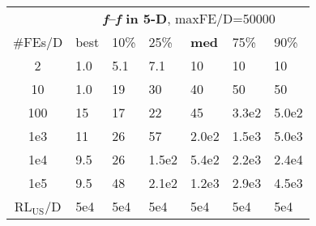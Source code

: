 \begin{tabular}{c|llllll}
 & \multicolumn{6}{|c}{\textbf{\textit{f}\raisebox{-0.35ex}{1}--\textit{f}\raisebox{-0.35ex}{24} in 5-D}, maxFE/D=50000}\\
\#FEs/D & best & 10\% & 25\% & \textbf{med} & 75\% & 90\%\\
2 & \hspace*{1ex}1.0 & \hspace*{1ex}5.1 & \hspace*{1ex}7.1 & 10 & 10 & 10\\
10 & \hspace*{1ex}1.0 & 19 & 30 & 40 & 50 & 50\\
100 & 15 & 17 & 22 & 45 & 3.3e2 & 5.0e2\\
1e3 & 11 & 26 & 57 & 2.0e2 & 1.5e3 & 5.0e3\\
1e4 & \hspace*{1ex}9.5 & 26 & 1.5e2 & 5.4e2 & 2.2e3 & 2.4e4\\
1e5 & \hspace*{1ex}9.5 & 48 & 2.1e2 & 1.2e3 & 2.9e3 & 4.5e3\\
$\text{RL}_{\text{US}}$/D & 5e4 & 5e4 & 5e4 & 5e4 & 5e4 & 5e4
\end{tabular}
